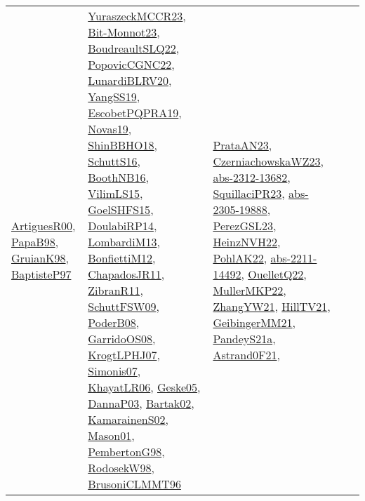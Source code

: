 {\begin{longtable}{lp{3cm}>{\raggedright}p{6cm}>{\raggedright}p{6cm}p{8cm}}
\href{articles/ArtiguesR00.pdf}{ArtiguesR00}\cite{ArtiguesR00}, \href{articles/PapaB98.pdf}{PapaB98}\cite{PapaB98}, \href{papers/GruianK98.pdf}{GruianK98}\cite{GruianK98}, \href{papers/BaptisteP97.pdf}{BaptisteP97}\cite{BaptisteP97} & \href{articles/YuraszeckMCCR23.pdf}{YuraszeckMCCR23}\cite{YuraszeckMCCR23}, \href{papers/Bit-Monnot23.pdf}{Bit-Monnot23}\cite{Bit-Monnot23}, \href{papers/BoudreaultSLQ22.pdf}{BoudreaultSLQ22}\cite{BoudreaultSLQ22}, \href{papers/PopovicCGNC22.pdf}{PopovicCGNC22}\cite{PopovicCGNC22}, \href{articles/LunardiBLRV20.pdf}{LunardiBLRV20}\cite{LunardiBLRV20}, \href{papers/YangSS19.pdf}{YangSS19}\cite{YangSS19}, \href{articles/EscobetPQPRA19.pdf}{EscobetPQPRA19}\cite{EscobetPQPRA19}, \href{articles/Novas19.pdf}{Novas19}\cite{Novas19}, \href{articles/ShinBBHO18.pdf}{ShinBBHO18}\cite{ShinBBHO18}, \href{papers/SchuttS16.pdf}{SchuttS16}\cite{SchuttS16}, \href{papers/BoothNB16.pdf}{BoothNB16}\cite{BoothNB16}, \href{papers/VilimLS15.pdf}{VilimLS15}\cite{VilimLS15}, \href{articles/GoelSHFS15.pdf}{GoelSHFS15}\cite{GoelSHFS15}, \href{papers/DoulabiRP14.pdf}{DoulabiRP14}\cite{DoulabiRP14}, \href{papers/LombardiM13.pdf}{LombardiM13}\cite{LombardiM13}, \href{papers/BonfiettiM12.pdf}{BonfiettiM12}\cite{BonfiettiM12}, \href{papers/ChapadosJR11.pdf}{ChapadosJR11}\cite{ChapadosJR11}, \href{papers/ZibranR11.pdf}{ZibranR11}\cite{ZibranR11}, \href{papers/SchuttFSW09.pdf}{SchuttFSW09}\cite{SchuttFSW09}, \href{papers/PoderB08.pdf}{PoderB08}\cite{PoderB08}, \href{articles/GarridoOS08.pdf}{GarridoOS08}\cite{GarridoOS08}, \href{papers/KrogtLPHJ07.pdf}{KrogtLPHJ07}\cite{KrogtLPHJ07}, \href{articles/Simonis07.pdf}{Simonis07}\cite{Simonis07}, \href{articles/KhayatLR06.pdf}{KhayatLR06}\cite{KhayatLR06}, \href{papers/Geske05.pdf}{Geske05}\cite{Geske05}, \href{papers/DannaP03.pdf}{DannaP03}\cite{DannaP03}, \href{papers/Bartak02.pdf}{Bartak02}\cite{Bartak02}, \href{papers/KamarainenS02.pdf}{KamarainenS02}\cite{KamarainenS02}, \href{articles/Mason01.pdf}{Mason01}\cite{Mason01}, \href{papers/PembertonG98.pdf}{PembertonG98}\cite{PembertonG98}, \href{papers/RodosekW98.pdf}{RodosekW98}\cite{RodosekW98}, \href{papers/BrusoniCLMMT96.pdf}{BrusoniCLMMT96}\cite{BrusoniCLMMT96} & \href{articles/PrataAN23.pdf}{PrataAN23}\cite{PrataAN23}, \href{articles/CzerniachowskaWZ23.pdf}{CzerniachowskaWZ23}\cite{CzerniachowskaWZ23}, \href{articles/abs-2312-13682.pdf}{abs-2312-13682}\cite{abs-2312-13682}, \href{papers/SquillaciPR23.pdf}{SquillaciPR23}\cite{SquillaciPR23}, \href{articles/abs-2305-19888.pdf}{abs-2305-19888}\cite{abs-2305-19888}, \href{papers/PerezGSL23.pdf}{PerezGSL23}\cite{PerezGSL23}, \href{articles/HeinzNVH22.pdf}{HeinzNVH22}\cite{HeinzNVH22}, \href{articles/PohlAK22.pdf}{PohlAK22}\cite{PohlAK22}, \href{articles/abs-2211-14492.pdf}{abs-2211-14492}\cite{abs-2211-14492}, \href{papers/OuelletQ22.pdf}{OuelletQ22}\cite{OuelletQ22}, \href{articles/MullerMKP22.pdf}{MullerMKP22}\cite{MullerMKP22}, \href{articles/ZhangYW21.pdf}{ZhangYW21}\cite{ZhangYW21}, \href{papers/HillTV21.pdf}{HillTV21}\cite{HillTV21}, \href{papers/GeibingerMM21.pdf}{GeibingerMM21}\cite{GeibingerMM21}, \href{articles/PandeyS21a.pdf}{PandeyS21a}\cite{PandeyS21a}, \href{papers/Astrand0F21.pdf}{Astrand0F21}\cite{Astrand0F21}, 
\end{longtable}}
